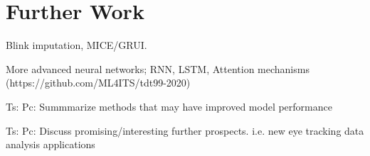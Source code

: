 \section{Further Work}

Blink imputation, MICE/GRUI.

More advanced neural networks; RNN, LSTM, Attention mechanisms (https://github.com/ML4ITS/tdt99-2020)


Ts: 
Pc: Summmarize methods that may have improved model performance

Ts: 
Pc: Discuss promising/interesting further prospects. i.e. new eye tracking data analysis applications